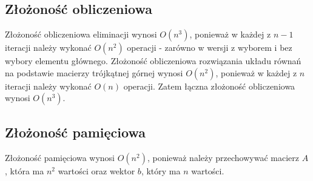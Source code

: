 \documentclass{article}
\begin{document}
\subsection{Złożoność obliczeniowa}
Złożoność obliczeniowa eliminacji wynosi $O(n^3)$, ponieważ w każdej z $n-1$ iteracji należy wykonać $O(n^2)$ operacji - zarówno w wersji z wyborem i bez wybory elementu głównego.
Złożoność obliczeniowa rozwiązania układu równań na podstawie macierzy trójkątnej górnej wynosi $O(n^2)$, ponieważ w każdej z $n$ iteracji należy wykonać $O(n)$ operacji.
Zatem łączna złożoność obliczeniowa wynosi $O(n^3)$.
\subsection{Złożoność pamięciowa}
Złożoność pamięciowa wynosi $O(n^2)$, ponieważ należy przechowywać macierz $A$, która ma $n^2$ wartości oraz wektor $b$, który ma $n$ wartości.
\end{document}
